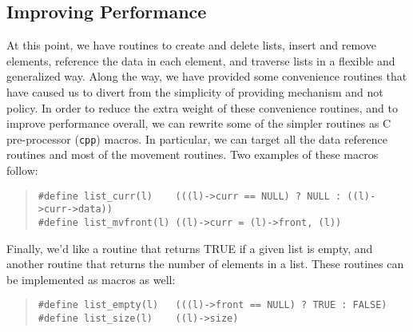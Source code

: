 \subsection{Improving Performance}
At this point, we have routines to create and delete lists, insert and remove
elements, reference the data in each element, and traverse lists in a flexible
and generalized way.  Along the way, we have provided some convenience
routines that have caused us to divert from the simplicity of providing
mechanism and not policy.  In order to reduce the extra weight of these
convenience routines, and to improve performance overall, we can rewrite some
of the simpler routines as C pre-processor ({\tt cpp}) macros.  In particular,
we can target all the data reference routines and most of the movement
routines.  Two examples of these macros follow:
\begin{quote}
\begin{verbatim}
#define list_curr(l)    (((l)->curr == NULL) ? NULL : ((l)->curr->data))
#define list_mvfront(l) ((l)->curr = (l)->front, (l))
\end{verbatim}
\end{quote}
Finally, we'd like a routine that returns TRUE if a given list is empty, and
another routine that returns the number of elements in a list.  These
routines can be implemented as macros as well:
\begin{quote}
\begin{verbatim}
#define list_empty(l)   (((l)->front == NULL) ? TRUE : FALSE)
#define list_size(l)    ((l)->size)
\end{verbatim}
\end{quote}

